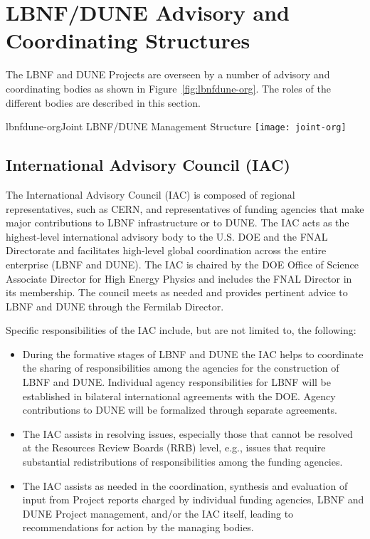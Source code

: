 \section{LBNF/DUNE Advisory and Coordinating Structures}
\label{sec:lbnf-dune-interface}


The LBNF and DUNE Projects are overseen by a number of advisory and
coordinating bodies as shown in Figure~\ref{fig:lbnfdune-org}.
The roles of the different bodies are described in this section.  

\begin{cdrfigure}{lbnfdune-org}{Joint LBNF/DUNE Management Structure}
  \texttt{[image: joint-org]}
\end{cdrfigure}


\subsection{International Advisory Council (IAC) }

The International Advisory Council (IAC) is composed of
regional representatives, such as CERN, and representatives of
funding agencies that make major contributions to LBNF infrastructure or to DUNE. The IAC 
acts as the highest-level international advisory body to the U.S.
DOE and the FNAL Directorate and facilitates
high-level global coordination across the entire enterprise (LBNF and DUNE).
The IAC is chaired by the DOE Office of Science Associate Director
for High Energy Physics and includes the FNAL Director in its membership.  
The council meets as needed and provides pertinent advice to %
LBNF and DUNE %
through the Fermilab Director.  


Specific responsibilities of the IAC include, but are not limited to,
the following:


\begin{itemize}
\item During the formative stages of LBNF and DUNE
the IAC helps to coordinate the sharing of responsibilities among
the agencies for the construction of LBNF and DUNE.
Individual agency responsibilities for LBNF will be established in
bilateral international agreements with the DOE. Agency contributions to
DUNE will be formalized through separate agreements.

\item The IAC assists in resolving issues, especially those
that cannot be resolved at the Resources Review Boards (RRB) level,
e.g., issues that require substantial redistributions of
responsibilities among the funding agencies.

\item The IAC assists as needed in the coordination,
synthesis and evaluation of input from Project reports charged by
individual funding agencies, LBNF and DUNE Project management,
and/or the IAC itself, leading to recommendations for action by
the managing bodies.
\end{itemize}

